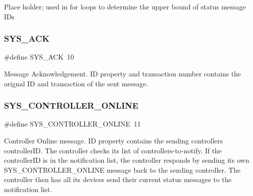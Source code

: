 Place holder; used in for loops to determine the upper bound of status message I\+Ds \mbox{\label{group___u_d_p_message_i_d_gaf3b0535ed1fed9f9dfb92b18ff78956c}} 
\subsubsection{\texorpdfstring{S\+Y\+S\+\_\+\+A\+CK}{SYS\_ACK}}
{\footnotesize\ttfamily \#define S\+Y\+S\+\_\+\+A\+CK~10}

Message Acknowledgement. ID property and transaction number contains the orignal ID and transaction of the sent message. \mbox{\label{group___u_d_p_message_i_d_ga23aab89076591390a1dbc412a3a07314}} 
\subsubsection{\texorpdfstring{S\+Y\+S\+\_\+\+C\+O\+N\+T\+R\+O\+L\+L\+E\+R\+\_\+\+O\+N\+L\+I\+NE}{SYS\_CONTROLLER\_ONLINE}}
{\footnotesize\ttfamily \#define S\+Y\+S\+\_\+\+C\+O\+N\+T\+R\+O\+L\+L\+E\+R\+\_\+\+O\+N\+L\+I\+NE~11}

Controller Online message. ID property contains the sending controller\textquotesingle{}s controller\+ID. The controller checks its list of controllers-\/to-\/notify. If the controller\+ID is in the notification list, the controller responds by sending its own S\+Y\+S\+\_\+\+C\+O\+N\+T\+R\+O\+L\+L\+E\+R\+\_\+\+O\+N\+L\+I\+NE message back to the sending controller. The controller then has all its devices send their current status messages to the notification list. \mbox{\label{group___u_d_p_message_i_d_ga777463f710ba53ab3b9bce0042ae93e5}} 
